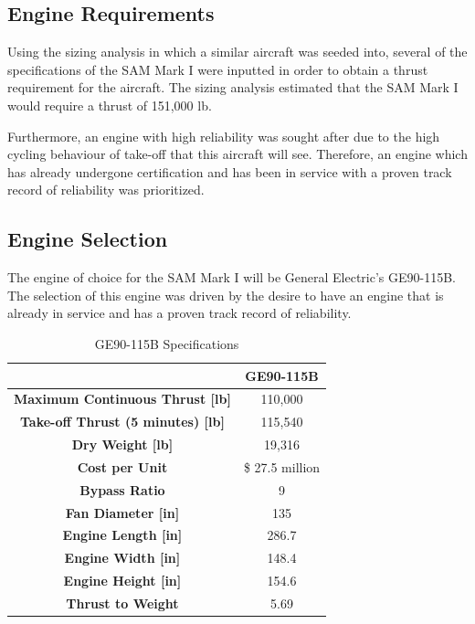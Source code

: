 \subsection{Engine Requirements}

Using the sizing analysis in which a similar aircraft was seeded into, several of the specifications of the SAM Mark I were inputted in order to obtain a thrust requirement for the aircraft. The sizing analysis estimated that the SAM Mark I would require a thrust of 151,000 lb.

Furthermore, an engine with high reliability was sought after due to the high cycling behaviour of take-off that this aircraft will see. Therefore, an engine which has already undergone certification and has been in service with a proven track record of reliability was prioritized.

\subsection{Engine Selection}

The engine of choice for the SAM Mark I will be General Electric's GE90-115B. The selection of this engine was driven by the desire to have an engine that is already in service and has a proven track record of reliability.

\begin{table}[!h]
    \centering
        \caption{GE90-115B Specifications}
    \begin{tabular}{|c||c|}\toprule
         & \textbf{GE90-115B} \\\hline \hline
         \textbf{Maximum Continuous Thrust [lb]} & 110,000  \cite{ge90} \\ \hline
         \textbf{Take-off Thrust (5 minutes) [lb]} & 115,540  \cite{ge90} \\ \hline
         \textbf{Dry Weight [lb]} & 19,316  \cite{ge90}  \\ \hline
         \textbf{Cost per Unit} &  \$ 27.5 million \cite{gecost}  \\ \hline
         \textbf{Bypass Ratio} & 9 \cite{safran}  \\ \hline
         \textbf{Fan Diameter [in]} & 135 \cite{ge} \\ \hline
         \textbf{Engine Length [in]} & 286.7 \cite{ge} \\ \hline
         \textbf{Engine Width [in]} & 148.4 \cite{ge} \\ \hline
         \textbf{Engine Height [in]} & 154.6 \cite{ge} \\ \hline
         \textbf{Thrust to Weight} & 5.69 \\ \bottomrule
    \end{tabular}
    \label{tab:GE90}
\end{table}

